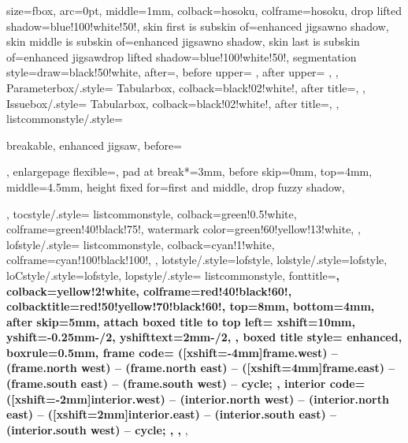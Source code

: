 {{    size=fbox,%
    arc=0pt,%
    middle=1mm,%
    colback=hosoku,%
    colframe=hosoku,%
    drop lifted shadow={blue!100!white!50!},%
    skin first is subskin of={enhanced jigsaw}{no shadow},%
    skin middle is subskin of={enhanced jigsaw}{no shadow},%
    skin last is subskin of={enhanced jigsaw}{drop lifted shadow={blue!100!white!50!}},%
    segmentation style={draw=black!50!white},%
    after=\smallskip\noindent{\color{white}},%
    before upper={%
      \tcbtitle%
      \setcounter{GlobalFootnote}{\value{footnote}}%
      \let\oldfootnote=\footnote%
      \def\footnote{\stepcounter{GlobalFootnote}\oldfootnote[\arabic{GlobalFootnote}]}%
      \renewcommand\thempfootnote{\arabic{mpfootnote}}%
    },
    after upper={%
      \setcounter{footnote}{\value{GlobalFootnote}}%
      \let\footnote=\oldfootnote%
    },
  },
  Parameterbox/.style={%
    Tabularbox,
    colback=black!02!white!,%
    after title=\hfill\termblue{\parametername},%
  },%
  Issuebox/.style={%
    Tabularbox,
    colback=black!02!white!,%
    after title=\hfill\termblue{\issuename},%
  },%
  listcommonstyle/.style={%
    breakable,%
    enhanced jigsaw,%
    before=\par\bigskip\noindent,%
    enlargepage flexible=\baselineskip,%
    pad at break*=3mm,%
    before skip=0mm,%
    top=4mm,%
    middle=4.5mm,
    height fixed for=first and middle,%
    drop fuzzy shadow,
  },
  tocstyle/.style={%
    listcommonstyle,
    colback=green!0.5!white,%
    colframe=green!40!black!75!,%
    watermark color=green!60!yellow!13!white,%
  },
  lofstyle/.style={%
    listcommonstyle,
    colback=cyan!1!white,%
    colframe=cyan!100!black!100!,%
  },
  lotstyle/.style={lofstyle},
  lolstyle/.style={lofstyle},
  loCstyle/.style={lofstyle},
  lopstyle/.style={%
    listcommonstyle,
    fonttitle=\sffamily\bfseries\large,%
    colback=yellow!2!white,%
    colframe=red!40!black!60!,%
    colbacktitle=red!50!yellow!70!black!60!,%
    top=8mm,
    bottom=4mm,
    after skip=5mm,
    attach boxed title to top left={%
      xshift=10mm,%
      yshift=-0.25mm-\tcboxedtitleheight/2,%
      yshifttext=2mm-\tcboxedtitleheight/2,%
    },
    boxed title style={%
      enhanced,%
      boxrule=0.5mm,%
      frame code={%
         ([xshift=-4mm]frame.west) -- (frame.north west)
        -- (frame.north east) -- ([xshift=4mm]frame.east)
        -- (frame.south east) -- (frame.south west) -- cycle;
      },
      interior code={
         ([xshift=-2mm]interior.west)
        -- (interior.north west) -- (interior.north east)
        -- ([xshift=2mm]interior.east) -- (interior.south east) -- (interior.south west)
        -- cycle;
      },
    },
  },
}
